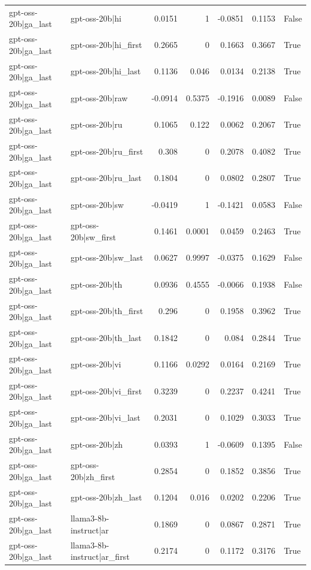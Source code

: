 \begin{table}
\begin{tabular}{l l r r r r l}
gpt-oss-20b|ga_last & gpt-oss-20b|hi & 0.0151 & 1 & -0.0851 & 0.1153 & False \\
gpt-oss-20b|ga_last & gpt-oss-20b|hi_first & 0.2665 & 0 & 0.1663 & 0.3667 & True \\
gpt-oss-20b|ga_last & gpt-oss-20b|hi_last & 0.1136 & 0.046 & 0.0134 & 0.2138 & True \\
gpt-oss-20b|ga_last & gpt-oss-20b|raw & -0.0914 & 0.5375 & -0.1916 & 0.0089 & False \\
gpt-oss-20b|ga_last & gpt-oss-20b|ru & 0.1065 & 0.122 & 0.0062 & 0.2067 & True \\
gpt-oss-20b|ga_last & gpt-oss-20b|ru_first & 0.308 & 0 & 0.2078 & 0.4082 & True \\
gpt-oss-20b|ga_last & gpt-oss-20b|ru_last & 0.1804 & 0 & 0.0802 & 0.2807 & True \\
gpt-oss-20b|ga_last & gpt-oss-20b|sw & -0.0419 & 1 & -0.1421 & 0.0583 & False \\
gpt-oss-20b|ga_last & gpt-oss-20b|sw_first & 0.1461 & 0.0001 & 0.0459 & 0.2463 & True \\
gpt-oss-20b|ga_last & gpt-oss-20b|sw_last & 0.0627 & 0.9997 & -0.0375 & 0.1629 & False \\
gpt-oss-20b|ga_last & gpt-oss-20b|th & 0.0936 & 0.4555 & -0.0066 & 0.1938 & False \\
gpt-oss-20b|ga_last & gpt-oss-20b|th_first & 0.296 & 0 & 0.1958 & 0.3962 & True \\
gpt-oss-20b|ga_last & gpt-oss-20b|th_last & 0.1842 & 0 & 0.084 & 0.2844 & True \\
gpt-oss-20b|ga_last & gpt-oss-20b|vi & 0.1166 & 0.0292 & 0.0164 & 0.2169 & True \\
gpt-oss-20b|ga_last & gpt-oss-20b|vi_first & 0.3239 & 0 & 0.2237 & 0.4241 & True \\
gpt-oss-20b|ga_last & gpt-oss-20b|vi_last & 0.2031 & 0 & 0.1029 & 0.3033 & True \\
gpt-oss-20b|ga_last & gpt-oss-20b|zh & 0.0393 & 1 & -0.0609 & 0.1395 & False \\
gpt-oss-20b|ga_last & gpt-oss-20b|zh_first & 0.2854 & 0 & 0.1852 & 0.3856 & True \\
gpt-oss-20b|ga_last & gpt-oss-20b|zh_last & 0.1204 & 0.016 & 0.0202 & 0.2206 & True \\
gpt-oss-20b|ga_last & llama3-8b-instruct|ar & 0.1869 & 0 & 0.0867 & 0.2871 & True \\
gpt-oss-20b|ga_last & llama3-8b-instruct|ar_first & 0.2174 & 0 & 0.1172 & 0.3176 & True \\

\end{tabular}
\end{table}
